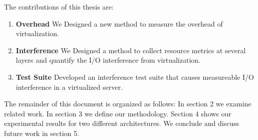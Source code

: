 \noindent
The contributions of this thesis are:
\begin{enumerate}
\item \textbf{Overhead} We Designed a new method to measure the overhead of virtualization.
\item \textbf{Interference} We Designed a method to collect resource metrics at several layers and quantify the I/O interference from virtualization.
\item \textbf{Test Suite} Developed an interference test suite that causes measureable I/O interference in a virtualized server.
\end{enumerate}

The remainder of this document is organized as follows:  In section 2 we examine related work.  In section 3 we define our methodology.  Section 4 shows our experimental results for two different architectures.   We conclude and discuss future work in section 5.

